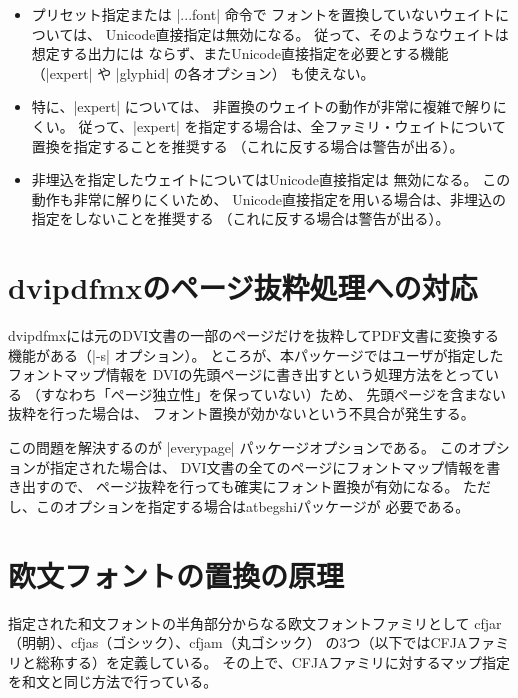 \documentclass[uplatex,dvipdfmx,a4paper]{jsarticle}
\newcommand{\Pkg}[1]{\textsf{#1}}
\providecommand{\Strong}[1]{\textsf{#1}}
\begin{document}
\begin{itemize}
\item プリセット指定または |\set...font| 命令で
  フォントを置換していないウェイトについては、
  Unicode直接指定は無効になる。
  従って、そのようなウェイトは想定する出力には
  ならず、またUnicode直接指定を必要とする機能
  （|expert| や |glyphid| の各オプション）
  も使えない。
\item 特に、|expert| については、
  非置換のウェイトの動作が非常に複雑で解りにくい。
  従って、|expert| を指定する場合は、全ファミリ・ウェイトについて
  置換を指定することを推奨する
  （これに反する場合は警告が出る）。
\item 非埋込を指定したウェイトについてはUnicode直接指定は
  無効になる。
  この動作も非常に解りにくいため、
  Unicode直接指定を用いる場合は、非埋込の指定をしないことを推奨する
  （これに反する場合は警告が出る）。
\end{itemize}


\section{dvipdfmxのページ抜粋処理への対応}
\label{sec:PageSelection}

dvipdfmxには元のDVI文書の一部のページだけを抜粋してPDF文書に変換する
機能がある（|-s| オプション）。
ところが、本パッケージではユーザが指定したフォントマップ情報を
DVIの先頭ページに書き出すという処理方法をとっている
（すなわち「ページ独立性」を保っていない）ため、
先頭ページを含まない抜粋を行った場合は、
フォント置換が効かないという不具合が発生する。

この問題を解決するのが |everypage| パッケージオプションである。
このオプションが指定された場合は、
DVI文書の全てのページにフォントマップ情報を書き出すので、
ページ抜粋を行っても確実にフォント置換が有効になる。
ただし、このオプションを指定する場合は\Pkg{atbegshi}パッケージが
必要である。

\section{欧文フォントの置換の原理}
\label{sec:Mechanism-Alph}

指定された和文フォントの半角部分からなる欧文フォントファミリとして
cfjar（明朝）、cfjas（ゴシック）、cfjam（丸ゴシック）
の3つ（以下では\Strong{CFJAファミリ}と総称する）を定義している。
その上で、CFJAファミリに対するマップ指定を和文と同じ方法で行っている。
\end{document}
